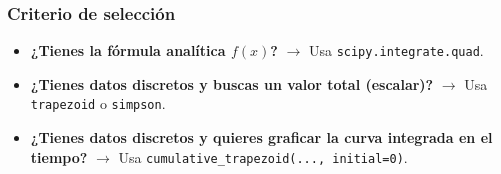 \documentclass[12pt]{article}
\begin{document}
\begin{cajaflex}
\subsubsection*{\textcolor{teal!70!black}{Criterio de selección }}
\begin{itemize}
    \item \textbf{¿Tienes la fórmula analítica $f(x)$?} $\longrightarrow$ Usa \texttt{scipy.integrate.quad}.
    \item \textbf{¿Tienes datos discretos y buscas un valor total (escalar)?} $\longrightarrow$ Usa \texttt{trapezoid} o \texttt{simpson}.
    \item \textbf{¿Tienes datos discretos y quieres graficar la curva integrada en el tiempo?} $\longrightarrow$ Usa \texttt{cumulative\_trapezoid(..., initial=0)}.
\end{itemize}

\end{cajaflex}

\end{document}

